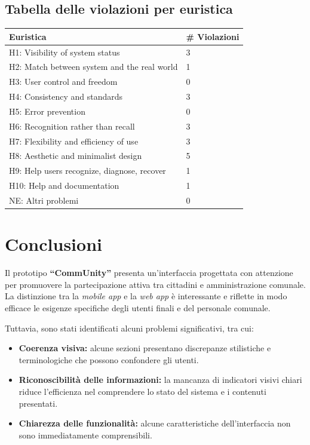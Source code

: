 \documentclass[a4paper,12pt]{article}
\begin{document}
\subsection*{Tabella delle violazioni per euristica}
\begin{longtable}{@{}ll@{}}
    \toprule
    \textbf{Euristica}                           & \textbf{\# Violazioni} \\ \midrule
    H1: Visibility of system status              & 3                      \\
    H2: Match between system and the real world  & 1                      \\
    H3: User control and freedom                 & 0                      \\
    H4: Consistency and standards                & 3                      \\
    H5: Error prevention                         & 0                      \\
    H6: Recognition rather than recall           & 3                      \\
    H7: Flexibility and efficiency of use        & 3                      \\
    H8: Aesthetic and minimalist design          & 5                      \\
    H9: Help users recognize, diagnose, recover  & 1                      \\
    H10: Help and documentation                  & 1                      \\
    NE: Altri problemi                           & 0                      \\ \bottomrule
\end{longtable}

\section*{Conclusioni}

Il prototipo \textbf{“CommUnity”} presenta un’interfaccia progettata con attenzione per promuovere la partecipazione attiva tra cittadini e amministrazione comunale. La distinzione tra la \textit{mobile app} e la \textit{web app} è interessante e riflette in modo efficace le esigenze specifiche degli utenti finali e del personale comunale.

Tuttavia, sono stati identificati alcuni problemi significativi, tra cui:
\begin{itemize}
    \item \textbf{Coerenza visiva:} alcune sezioni presentano discrepanze stilistiche e terminologiche che possono confondere gli utenti.
    \item \textbf{Riconoscibilità delle informazioni:} la mancanza di indicatori visivi chiari riduce l’efficienza nel comprendere lo stato del sistema e i contenuti presentati.
    \item \textbf{Chiarezza delle funzionalità:} alcune caratteristiche dell’interfaccia non sono immediatamente comprensibili.
\end{itemize}
\end{document}
